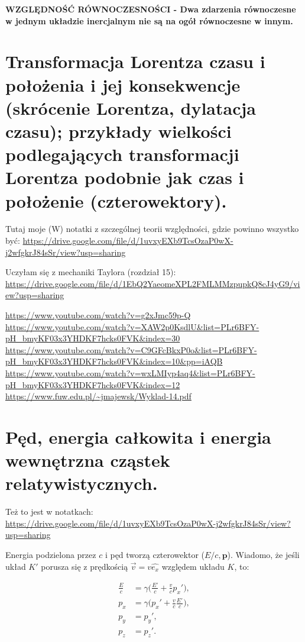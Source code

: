 \documentclass{article}
\begin{document}
\noindent \textbf{WZGLĘDNOŚĆ RÓWNOCZESNOŚCI - Dwa zdarzenia równoczesne w jednym układzie inercjalnym nie są na ogół równoczesne w innym.}

\section{Transformacja Lorentza czasu i położenia i jej konsekwencje (skrócenie Lorentza, dylatacja czasu); przykłady wielkości podlegających transformacji Lorentza podobnie jak czas i położenie (czterowektory).}

Tutaj moje (W) notatki z szczególnej teorii względności, gdzie powinno wszystko być: \url{https://drive.google.com/file/d/1uvxyEXb9TcsOzaP0wX-j2wfgkrJ84sSr/view?usp=sharing}

Uczyłam się z mechaniki Taylora (rozdział 15): \url{https://drive.google.com/file/d/1EbQ2YaeomeXPL2FMLMMzpupkQ8cJ4yG9/view?usp=sharing} 

\vspace{0.5cm}
\url{https://www.youtube.com/watch?v=g2xJmc59p-Q}\\

\url{https://www.youtube.com/watch?v=XAW2p0KsdlU&list=PLr6BFY-pH_bmyKF03x3YHDKF7hcks0FVK&index=30}\\

\url{https://www.youtube.com/watch?v=C9GFcBkxP0o&list=PLr6BFY-pH_bmyKF03x3YHDKF7hcks0FVK&index=10&pp=iAQB}\\

\url{https://www.youtube.com/watch?v=wxLMIyp4aq4&list=PLr6BFY-pH_bmyKF03x3YHDKF7hcks0FVK&index=12}\\

\url{https://www.fuw.edu.pl/~jmajewsk/Wyklad-14.pdf}\\


\section{Pęd, energia całkowita i energia wewnętrzna cząstek relatywistycznych.}

Też to jest w notatkach: \url{https://drive.google.com/file/d/1uvxyEXb9TcsOzaP0wX-j2wfgkrJ84sSr/view?usp=sharing}


\noindent Energia podzielona przez $c$ i pęd tworzą czterowektor ($E/c, \textbf{p}$). Wiadomo, że jeśli układ $K'$ porusza się z prędkością $\vec{v} = v \hat{e_x}$ względem układu $K$, to:

\begin{align*}
\frac{E}{c} &= \gamma \biggl(\frac{E'}{c} + \frac{v}{c}p_x'\biggr), \\
p_x &= \gamma \biggl(p_x' + \frac{v}{c} \frac{E'}{c}\biggr), \\
p_y &= p_y', \\
p_z &= p_z'.
\end{align*}
\end{document}
